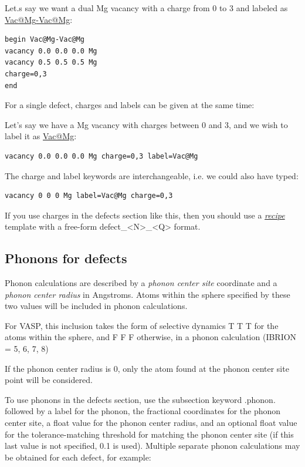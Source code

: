 \documentclass[letterpaper,10pt,english]{sphinxmanual}
\begin{document}
Let.s say we want a dual Mg vacancy with a charge from 0 to 3 and labeled as \href{mailto:Vac@Mg}{Vac@Mg}\href{mailto:-Vac@Mg}{-Vac@Mg}:

\begin{Verbatim}[commandchars=\\\{\}]
begin Vac@Mg-Vac@Mg
vacancy 0.0 0.0 0.0 Mg
vacancy 0.5 0.5 0.5 Mg
charge=0,3
end
\end{Verbatim}

For a single defect, charges and labels can be given at the same time:

Let's say we have a Mg vacancy with charges between 0 and 3, and we wish to label it as \href{mailto:Vac@Mg}{Vac@Mg}:

\begin{Verbatim}[commandchars=\\\{\}]
vacancy 0.0 0.0 0.0 Mg charge=0,3 label=Vac@Mg
\end{Verbatim}

The charge and label keywords are interchangeable, i.e. we could also have typed:

\begin{Verbatim}[commandchars=\\\{\}]
vacancy 0 0 0 Mg label=Vac@Mg charge=0,3
\end{Verbatim}

If you use charges in the defects section like this, then you should use a {\hyperref[4_0_recipe::doc]{\emph{recipe}}} template with a free-form defect\_\textless{}N\textgreater{}\_\textless{}Q\textgreater{} format.


\subsection{Phonons for defects}
\label{3_0_inputfile:phonons-for-defects}
Phonon calculations are described by a \emph{phonon center site} coordinate and a \emph{phonon center radius} in Angstroms. Atoms within the sphere specified by these two values will be included in phonon calculations.

For VASP, this inclusion takes the form of selective dynamics T T T for the atoms within the sphere, and F F F otherwise, in a phonon calculation (IBRION = 5, 6, 7, 8)

If the phonon center radius is 0, only the atom found at the phonon center site point will be considered.

To use phonons in the defects section, use the subsection keyword .phonon. followed by a label for the phonon, the fractional coordinates for the phonon center site, a float value for the phonon center radius, and an optional float value for the tolerance-matching threshold for matching the phonon center site (if this last value is not specified, 0.1 is used). Multiple separate phonon calculations may be obtained for each defect, for example:
\end{document}
